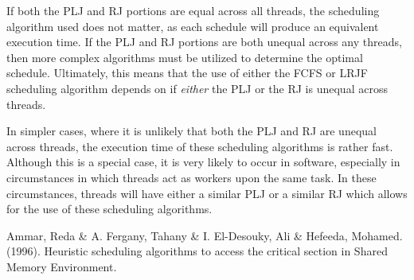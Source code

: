 \documentclass[letterpaper,12pt]{article}
\begin{document}
If both the PLJ and RJ portions are equal across all threads, the scheduling algorithm used does not matter, as each schedule will produce an equivalent execution time.
If the PLJ and RJ portions are both unequal across any threads, then more complex algorithms must be utilized to determine the optimal schedule.
Ultimately, this means that the use of either the FCFS or LRJF scheduling algorithm depends on if \textit{either} the PLJ or the RJ is unequal across threads.

In simpler cases, where it is unlikely that both the PLJ and RJ are unequal across threads, the execution time of these scheduling algorithms is rather fast.
Although this is a special case, it is very likely to occur in software, especially in circumstances in which threads act as workers upon the same task.
In these circumstances, threads will have either a similar PLJ or a similar RJ which allows for the use of these scheduling algorithms.


\begin{thebibliography}{99}

Ammar, Reda \& A. Fergany, Tahany \& I. El-Desouky, Ali \& Hefeeda, Mohamed. (1996). Heuristic scheduling algorithms to access the critical section in Shared Memory Environment. 

\end{thebibliography}
\end{document}

